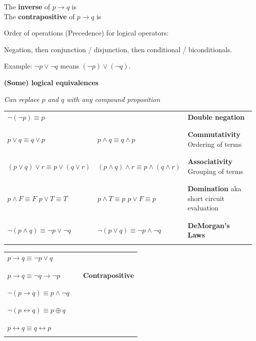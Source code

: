\documentclass[12pt, oneside]{article}
\begin{document}
The {\bf inverse}  of $p \to q$ is \underline{}\\

The {\bf contrapositive}  of $p \to q$ is \underline{} \\
 \vfill


Order of operations (Precedence) for logical operators: 

Negation, then conjunction / disjunction, then conditional / biconditionals.

Example: $\lnot p \lor \lnot q$ means $(\lnot p) \lor (\lnot q)$.
 \newpage


{\bf (Some) logical equivalences}

{\it Can replace $p$ and $q$ with any compound proposition}

\begin{tabular}{llp{3in}}
$\lnot ( \lnot p) \equiv p$ & & {\bf Double negation}\\
&& \\
&& \\
$p \lor q \equiv q \lor p$ & $p \land q \equiv q \land p$ & {\bf Commutativity} Ordering of terms\\
&& \\
&& \\
$(p \lor q) \lor r  \equiv p \lor (q \lor r)$ & $(p \land q) \land r  \equiv p \land (q \land r)$ & {\bf Associativity} Grouping of terms\\
&& \\
&& \\
$p \land F \equiv F$ \qquad $p \lor T \equiv T$ & $p \land T \equiv p$ \qquad $p \lor F \equiv p$ & {\bf Domination} aka 
short circuit evaluation\\
&& \\
&& \\
$\lnot (p \land q) \equiv \lnot p \lor \lnot q$ & $\lnot (p \lor q) \equiv \lnot p \land\lnot q$  & {\bf DeMorgan's Laws}\\
&& \\
\end{tabular}

\begin{tabular}{llp{3in}}
$p \to q \equiv \lnot p \lor q$ & & \\
&& \\
&& \\
$p \to q \equiv \lnot q \to \lnot p$ & &{\bf Contrapositive} \\
&& \\
&& \\
$\lnot (p \to q) \equiv p\land \lnot q$  & &\\
&& \\
&& \\
$\lnot( p \leftrightarrow q) \equiv p \oplus q$ && \\
&& \\
&& \\
$p \leftrightarrow q \equiv q \leftrightarrow p$ &&\\
&& \\
\end{tabular}
\end{document}
